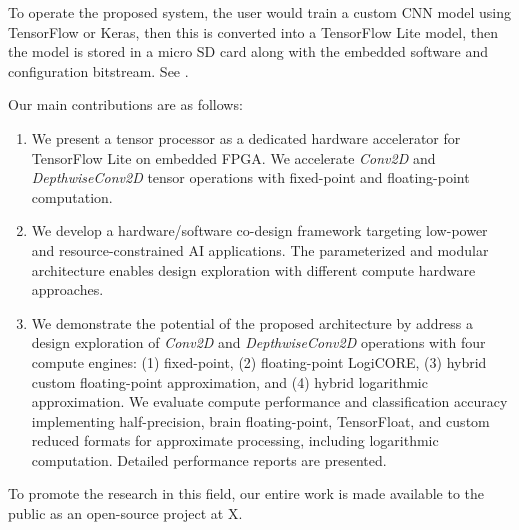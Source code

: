 To operate the proposed system, the user would train a custom CNN model using TensorFlow or Keras, then this is converted into a TensorFlow Lite model, then the model is stored in a micro SD card along with the embedded software and configuration bitstream. See .

Our main contributions are as follows:
\begin{enumerate}
	\item We present a tensor processor as a dedicated hardware accelerator for TensorFlow Lite on embedded FPGA. We accelerate \emph{Conv2D} and \emph{DepthwiseConv2D} tensor operations with fixed-point and floating-point computation.
	\item We develop a hardware/software co-design framework targeting low-power and resource-constrained AI applications. The parameterized and modular architecture enables design exploration with different compute hardware approaches.
	\item We demonstrate the potential of the proposed architecture by address a design exploration of \emph{Conv2D} and \emph{DepthwiseConv2D} operations with four compute engines: (1) fixed-point, (2) floating-point LogiCORE, (3) hybrid custom floating-point approximation, and (4) hybrid logarithmic approximation. We evaluate compute performance and classification accuracy implementing half-precision, brain floating-point, TensorFloat, and custom reduced formats for approximate processing, including logarithmic computation. Detailed performance reports are presented.
\end{enumerate}

To promote the research in this field, our entire work is made available to the public as an open-source project at X.